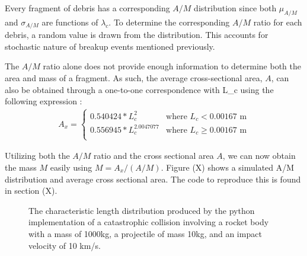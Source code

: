 \documentclass[a4paper, 12pt]{article}
\begin{document}
Every fragment of debris has a corresponding $A/M$ distribution since both $\mu_{A/M}$ and $\sigma_{A/M}$ are functions of $\lambda_c$. To determine the corresponding $A/M$ ratio for each debris, a random value is drawn from the distribution. This accounts for stochastic nature of breakup events mentioned previously. 

The $A/M$ ratio alone does not provide enough information to determine both the area and mass of a fragment. As such, the average cross-sectional area, $A$, can also be obtained through a one-to-one correspondence with \Gls{L_c} using the following expression \citep{johnson_nasas_2001}:
\begin{align}
	A_x = \begin{cases}
		0.540424 * L_c^2 & \text{where } L_c < 0.00167 \text{ m} \\
		0.556945 * L_c^{2.0047077} & \text{where } L_c \geq 0.00167 \text{ m} \\
	\end{cases}
\end{align}

Utilizing both the $A/M$ ratio and the cross sectional area $A$, we can now obtain the mass $M$ easily using
$M = A_x / (A/M)$.
Figure (X)  shows a simulated A/M distribution and average cross sectional area. The code to reproduce this is found in section (X).
\begin{figure}[H]
	\begin{adjustbox}{max width=1\linewidth,center}
		\centering     %
	\end{adjustbox}
	\caption{The characteristic length distribution produced by the python implementation of a catastrophic collision involving a rocket body with a mass of 1000kg, a projectile of mass 10kg, and an impact velocity of 10 km/s. }
\end{figure}
\end{document}
